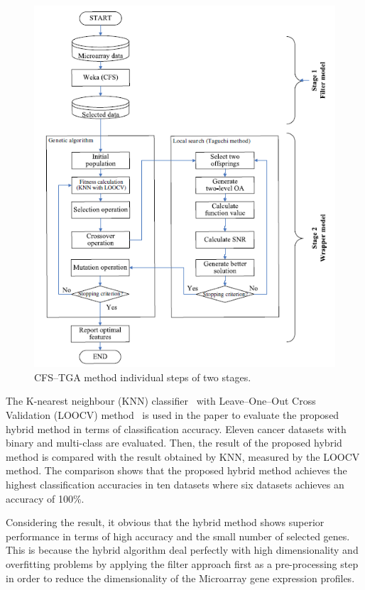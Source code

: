 \documentclass[runningheads]{llncs}
\begin{document}
\begin{figure}
	\includegraphics[width=\textwidth]{fig1}
	\caption{CFS–TGA method individual steps of two stages.}
	\label{fig1}
\end{figure}

The K-nearest neighbour (KNN) classifier~\cite{cover1967nearest,fix1985discriminatory} with Leave–One–Out Cross Validation (LOOCV) method~\cite{cawley2003efficient,stone1974cross} is used in the paper to evaluate the proposed hybrid method in terms of classification accuracy. Eleven cancer datasets with binary and multi-class are evaluated. Then, the result of the proposed hybrid method is compared with the result obtained by KNN, measured by the LOOCV method. The comparison shows that the proposed hybrid method achieves the highest classification accuracies in ten datasets where six datasets achieves an accuracy of 100\%.

Considering the result, it obvious that the hybrid method shows superior performance in terms of high accuracy and the small number of selected genes. This is because the hybrid algorithm deal perfectly with high dimensionality and overfitting problems by applying the filter approach first as a pre-processing step in order to reduce the dimensionality of the Microarray gene expression profiles.
\end{document}
